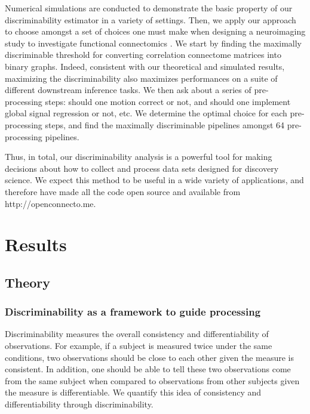 \documentclass{article}
\begin{document}
Numerical simulations are conducted to demonstrate the basic property of our discriminability estimator in a variety of settings. Then, we apply our approach to choose amongst a set of choices one must make when designing a neuroimaging study to investigate functional connectomics \cite{fox2005human}\cite{biswal2010toward}. We start by finding the maximally discriminable threshold for converting correlation connectome matrices into binary graphs. Indeed, consistent with our theoretical and simulated results, maximizing the discriminability also maximizes performances on a suite of different downstream inference tasks. We then ask about a series of pre-processing steps: should one motion correct or not, and should one implement global signal regression or not, etc. We determine the optimal choice for each pre-processing steps, and find the maximally discriminable pipelines amongst 64 pre-processing pipelines.

Thus, in total, our discriminability analysis is a powerful tool for making decisions about how to collect and process data sets designed for discovery science. We expect this method to be useful in a wide variety of applications,
and therefore have made all the code open source and available from http://openconnecto.me.




\section{Results}
\subsection{Theory}

\subsubsection{Discriminability as a framework to guide processing}
Discriminability measures the overall consistency and differentiability of observations. For example, if a subject is measured twice under the same conditions, two observations should be close to each other given the measure is consistent. In addition, one should be able to tell these two observations come from the same subject when compared to observations from other subjects given the measure is differentiable. We quantify this idea of consistency and differentiability through discriminability. 
\end{document}
